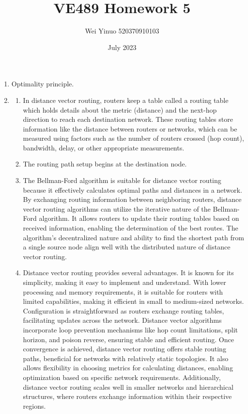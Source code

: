\documentclass{article}
\title{VE489 Homework 5}
\author{Wei Yinuo 520370910103}
\date{July 2023}
\begin{document}
\maketitle
\begin{enumerate}
    \item 
    Optimality principle.
    
    \item
    \begin{enumerate}
        \item In distance vector routing, routers keep a table called a routing table which holds details about the metric (distance) and the next-hop direction to reach each destination network. These routing tables store information like the distance between routers or networks, which can be measured using factors such as the number of routers crossed (hop count), bandwidth, delay, or other appropriate measurements.
        
        \item
        The routing path setup begins at the destination node. 
        
        \item
        The Bellman-Ford algorithm is suitable for distance vector routing because it effectively calculates optimal paths and distances in a network. By exchanging routing information between neighboring routers, distance vector routing algorithms can utilize the iterative nature of the Bellman-Ford algorithm. It allows routers to update their routing tables based on received information, enabling the determination of the best routes. The algorithm's decentralized nature and ability to find the shortest path from a single source node align well with the distributed nature of distance vector routing.
        
        \item
        Distance vector routing provides several advantages. It is known for its simplicity, making it easy to implement and understand. With lower processing and memory requirements, it is suitable for routers with limited capabilities, making it efficient in small to medium-sized networks. Configuration is straightforward as routers exchange routing tables, facilitating updates across the network. Distance vector algorithms incorporate loop prevention mechanisms like hop count limitations, split horizon, and poison reverse, ensuring stable and efficient routing.
        \newline
        Once convergence is achieved, distance vector routing offers stable routing paths, beneficial for networks with relatively static topologies. It also allows flexibility in choosing metrics for calculating distances, enabling optimization based on specific network requirements. Additionally, distance vector routing scales well in smaller networks and hierarchical structures, where routers exchange information within their respective regions.
        

\end{enumerate}
\end{enumerate}
\end{document}
